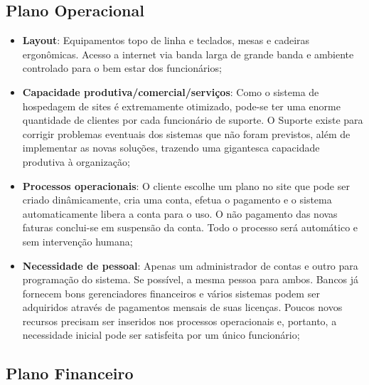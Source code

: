\documentclass[12pt]{article}
\begin{document}
\subsection{Plano Operacional}
\begin{itemize}

	\item \textbf{Layout}: Equipamentos topo de linha e teclados, mesas e cadeiras ergonômicas. Acesso a internet via banda larga de grande banda e ambiente controlado para o bem estar dos funcionários;
	
	\item \textbf{Capacidade produtiva/comercial/serviços}: Como o sistema de hospedagem de sites é extremamente otimizado, pode-se ter uma enorme quantidade de clientes por cada funcionário de suporte. O Suporte existe para corrigir problemas eventuais dos sistemas que não foram previstos, além de implementar as novas soluções, trazendo uma gigantesca capacidade produtiva à organização;
	
	\item \textbf{Processos operacionais}: O cliente escolhe um plano no site que pode ser criado dinâmicamente, cria uma conta, efetua o pagamento e o sistema automaticamente libera a conta para o uso. O não pagamento das novas faturas conclui-se em suspensão da conta. Todo o processo será automático e sem intervenção humana;
	
	\item \textbf{Necessidade de pessoal}: Apenas um administrador de contas e outro para programação do sistema. Se possível, a mesma pessoa para ambos. Bancos já fornecem bons gerenciadores financeiros e vários sistemas podem ser adquiridos através de pagamentos mensais de suas licenças. Poucos novos recursos precisam ser inseridos nos processos operacionais e, portanto, a necessidade inicial pode ser satisfeita por um único funcionário;

\end{itemize}

\subsection{Plano Financeiro}
\end{document}
